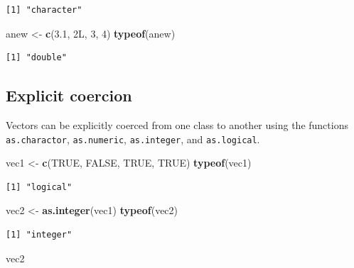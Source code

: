\documentclass[
]{book}
\newenvironment{Shaded}{\begin{snugshade}}{\end{snugshade}}
\newcommand{\DecValTok}[1]{\textcolor[rgb]{0.00,0.00,0.81}{#1}}
\newcommand{\FloatTok}[1]{\textcolor[rgb]{0.00,0.00,0.81}{#1}}
\newcommand{\KeywordTok}[1]{\textcolor[rgb]{0.13,0.29,0.53}{\textbf{#1}}}
\newcommand{\NormalTok}[1]{#1}
\newcommand{\OtherTok}[1]{\textcolor[rgb]{0.56,0.35,0.01}{#1}}
\newcommand{\StringTok}[1]{\textcolor[rgb]{0.31,0.60,0.02}{#1}}
\begin{document}
\begin{verbatim}
[1] "character"
\end{verbatim}

\begin{Shaded}
\begin{Highlighting}[]
\NormalTok{anew <-}\StringTok{ }\KeywordTok{c}\NormalTok{(}\FloatTok{3.1}\NormalTok{, 2L, }\DecValTok{3}\NormalTok{, }\DecValTok{4}\NormalTok{)}
\KeywordTok{typeof}\NormalTok{(anew) }
\end{Highlighting}
\end{Shaded}

\begin{verbatim}
[1] "double"
\end{verbatim}

\hypertarget{explicit-coercion}{%
\subsection{Explicit coercion}\label{explicit-coercion}}

Vectors can be explicitly coerced from one class to another using the functions \texttt{as.charactor}, \texttt{as.numeric}, \texttt{as.integer}, and \texttt{as.logical}.

\begin{Shaded}
\begin{Highlighting}[]
\NormalTok{vec1 <-}\StringTok{ }\KeywordTok{c}\NormalTok{(}\OtherTok{TRUE}\NormalTok{, }\OtherTok{FALSE}\NormalTok{, }\OtherTok{TRUE}\NormalTok{, }\OtherTok{TRUE}\NormalTok{)}
\KeywordTok{typeof}\NormalTok{(vec1)}
\end{Highlighting}
\end{Shaded}

\begin{verbatim}
[1] "logical"
\end{verbatim}

\begin{Shaded}
\begin{Highlighting}[]
\NormalTok{vec2 <-}\StringTok{ }\KeywordTok{as.integer}\NormalTok{(vec1)}
\KeywordTok{typeof}\NormalTok{(vec2)}
\end{Highlighting}
\end{Shaded}

\begin{verbatim}
[1] "integer"
\end{verbatim}

\begin{Shaded}
\begin{Highlighting}[]
\NormalTok{vec2}
\end{Highlighting}
\end{Shaded}
\end{document}

